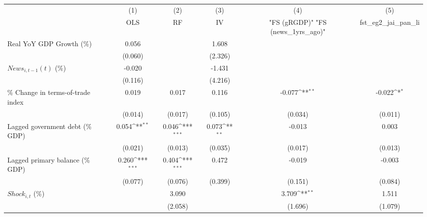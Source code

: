 {
\def\sym#1{\ifmmode^{#1}\else\(^{#1}\)\fi}
\begin{tabular}{l*{5}{c}}
\toprule
                    &\multicolumn{1}{c}{(1)}&\multicolumn{1}{c}{(2)}&\multicolumn{1}{c}{(3)}&\multicolumn{1}{c}{(4)}&\multicolumn{1}{c}{(5)}\\
                    &\multicolumn{1}{c}{OLS}&\multicolumn{1}{c}{RF}&\multicolumn{1}{c}{IV}&\multicolumn{1}{c}{ "FS (gRGDP)"  "FS (news_1yrs_ago)" }&\multicolumn{1}{c}{fst_eg2_jai_pan_li}\\
\midrule
Real YoY GDP Growth (\%)&       0.056         &                     &       1.608         &                     &                     \\
                    &     (0.060)         &                     &     (2.326)         &                     &                     \\
\addlinespace
$ News_{i,t-1}(t)$ (\%)&      -0.020         &                     &      -1.431         &                     &                     \\
                    &     (0.116)         &                     &     (4.216)         &                     &                     \\
\addlinespace
\% Change in terms-of-trade index&       0.019         &       0.017         &       0.116         &      -0.077\sym{**} &      -0.022\sym{*}  \\
                    &     (0.014)         &     (0.017)         &     (0.105)         &     (0.034)         &     (0.011)         \\
\addlinespace
Lagged government debt (\% GDP)&       0.054\sym{**} &       0.046\sym{***}&       0.073\sym{**} &      -0.013         &       0.003         \\
                    &     (0.021)         &     (0.013)         &     (0.035)         &     (0.017)         &     (0.013)         \\
\addlinespace
Lagged primary balance (\% GDP)&       0.260\sym{***}&       0.404\sym{***}&       0.472         &      -0.019         &      -0.003         \\
                    &     (0.077)         &     (0.076)         &     (0.399)         &     (0.151)         &     (0.084)         \\
\addlinespace
$ Shock_{i,t}$ (\%) &                     &       3.090         &                     &       3.709\sym{**} &       1.511         \\
                    &                     &     (2.058)         &                     &     (1.696)         &     (1.079)         \\

\end{tabular}}
